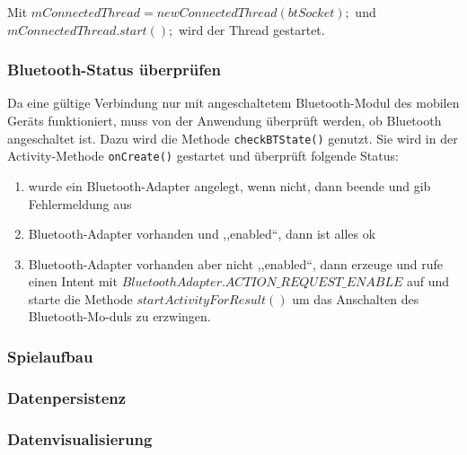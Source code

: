 \documentclass[10pt, a4paper, oneside, titlepage]{scrartcl} %
\begin{document}
	Mit $mConnectedThread = new ConnectedThread(btSocket);$ und \\$mConnectedThread.start();$ wird der Thread gestartet.
	
	\subsubsection*{Bluetooth-Status überprüfen}
	
	Da eine gültige Verbindung nur mit angeschaltetem Bluetooth-Modul des mobilen Geräts funktioniert, muss von der Anwendung überprüft werden, ob Bluetooth angeschaltet ist. Dazu wird die Methode \texttt{checkBTState()} genutzt. Sie wird in der Activity-Methode \texttt{onCreate()} gestartet und überprüft folgende Status:
	\begin{enumerate}
	\item wurde ein Bluetooth-Adapter angelegt, wenn nicht, dann beende und gib Fehlermeldung aus
	\item Bluetooth-Adapter vorhanden und ,,enabled``, dann ist alles ok
	\item Bluetooth-Adapter vorhanden aber nicht ,,enabled``, dann erzeuge und rufe einen Intent mit $BluetoothAdapter.ACTION\_REQUEST\_ENABLE$ auf und starte die Methode $startActivityForResult()$ um das Anschalten des Bluetooth-Mo-duls zu erzwingen.
	\end{enumerate}
	
	\subsubsection{Spielaufbau}
	
	
	\subsubsection{Datenpersistenz}
	
	
	\subsubsection{Datenvisualisierung}
   	
\label{letzte_seite} %
\end{document}

